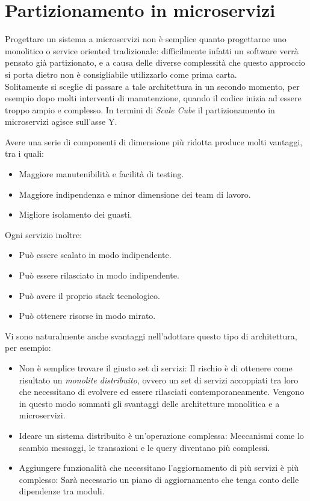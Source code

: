 \section{Partizionamento in microservizi}
Progettare un sistema a microservizi non è semplice quanto progettarne uno monolitico o service oriented tradizionale: difficilmente infatti un software verrà pensato già partizionato, e a causa delle diverse complessità che questo approccio si porta dietro non è consigliabile utilizzarlo come prima carta.\\
Solitamente si sceglie di passare a tale architettura in un secondo momento, per esempio dopo molti interventi di manutenzione, quando il codice inizia ad essere troppo ampio e complesso.\cite{microservices_architecture}
In termini di \textit{Scale Cube} il partizionamento in microservizi agisce sull'asse Y.

Avere una serie di componenti di dimensione più ridotta produce molti vantaggi, tra i quali:
\begin{itemize}
	\item Maggiore manutenibilità e facilità di testing.
	\item Maggiore indipendenza e minor dimensione dei team di lavoro.
	\item Migliore isolamento dei guasti.
\end{itemize}

Ogni servizio inoltre:
\begin{itemize}
	\item Può essere scalato in modo indipendente.
	\item Può essere rilasciato in modo indipendente.
	\item Può avere il proprio stack tecnologico.
	\item Può ottenere risorse in modo mirato.
\end{itemize}

Vi sono naturalmente anche svantaggi nell'adottare questo tipo di architettura, per esempio:
\begin{itemize}
	\item Non è semplice trovare il giusto set di servizi: Il rischio è di ottenere come risultato un \textit{monolite distribuito}, ovvero un set di servizi accoppiati tra loro che necessitano di evolvere ed essere rilasciati contemporaneamente.
	Vengono in questo modo sommati gli svantaggi delle architetture monolitica e a microservizi.
	\item Ideare un sistema distribuito è un'operazione complessa: Meccanismi come lo scambio messaggi, le transazioni e le query diventano più complessi.
	\item Aggiungere funzionalità che necessitano l'aggiornamento di più servizi è più complesso: Sarà necessario un piano di aggiornamento che tenga conto delle dipendenze tra moduli.
\end{itemize}

